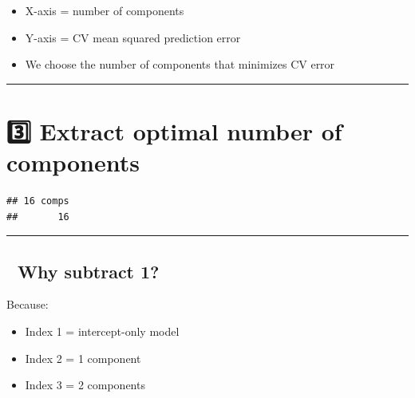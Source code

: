 \documentclass[
]{article}
\newenvironment{Shaded}{\begin{snugshade}}{\end{snugshade}}
\newcommand{\CommentTok}[1]{\textcolor[rgb]{0.56,0.35,0.01}{\textit{#1}}}
\newcommand{\DecValTok}[1]{\textcolor[rgb]{0.00,0.00,0.81}{#1}}
\newcommand{\FunctionTok}[1]{\textcolor[rgb]{0.13,0.29,0.53}{\textbf{#1}}}
\newcommand{\NormalTok}[1]{#1}
\newcommand{\OtherTok}[1]{\textcolor[rgb]{0.56,0.35,0.01}{#1}}
\newcommand{\SpecialCharTok}[1]{\textcolor[rgb]{0.81,0.36,0.00}{\textbf{#1}}}
\providecommand{\tightlist}{%
  \setlength{\itemsep}{0pt}\setlength{\parskip}{0pt}}
\begin{document}
\begin{itemize}
\tightlist
\item
  X-axis = number of components\\
\item
  Y-axis = CV mean squared prediction error\\
\item
  We choose the number of components that minimizes CV error
\end{itemize}

\begin{center}\rule{0.5\linewidth}{0.5pt}\end{center}

\section{3️⃣ Extract optimal number of
components}\label{extract-optimal-number-of-components}

\begin{Shaded}
\end{Shaded}

\begin{verbatim}
## 16 comps 
##       16
\end{verbatim}

\begin{center}\rule{0.5\linewidth}{0.5pt}\end{center}

\subsection{🔎 Why subtract 1?}\label{why-subtract-1}

Because:

\begin{itemize}
\tightlist
\item
  Index 1 = intercept-only model\\
\item
  Index 2 = 1 component\\
\item
  Index 3 = 2 components
\end{itemize}
\end{document}
